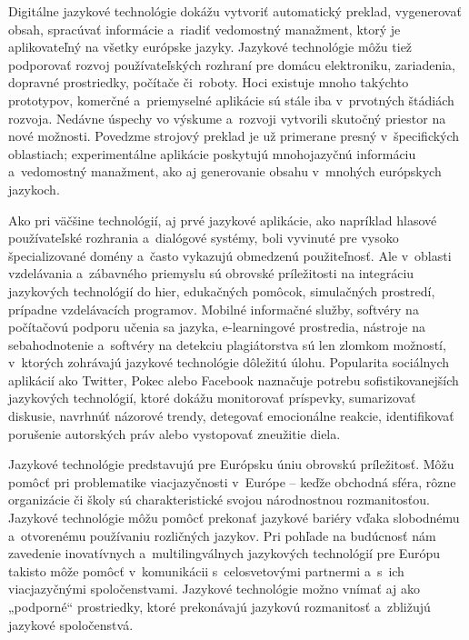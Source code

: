 \begin{multicols}{2}
Digitálne jazykové technológie dokážu vytvoriť automatický preklad, vygenerovať obsah, spracúvať informácie a~riadiť vedomostný manažment, ktorý je aplikovateľný na všetky európske jazyky. Jazykové technológie môžu tiež podporovať rozvoj používateľských rozhraní pre domácu elektroniku, zariadenia, dopravné prostriedky, počítače či~roboty. Hoci existuje mnoho takýchto prototypov, komerčné a~priemyselné aplikácie sú stále iba v~prvotných štádiách rozvoja. Nedávne úspechy vo výskume a~rozvoji vytvorili skutočný priestor na nové možnosti. Povedzme strojový preklad je už primerane presný v~špecifických oblastiach; experimentálne aplikácie poskytujú mnohojazyčnú informáciu a~vedomostný manažment, ako aj generovanie obsahu v~mnohých európskych jazykoch.

Ako pri väčšine technológií, aj prvé jazykové aplikácie, ako napríklad hlasové používateľské rozhrania a~dialógové systémy, boli vyvinuté pre vysoko špecializované domény a~často vykazujú obmedzenú použiteľnosť. Ale v~oblasti vzdelávania a~zábavného priemyslu sú obrovské príležitosti na integráciu jazykových technológií do hier, edukačných pomôcok, simulačných prostredí, prípadne vzdelávacích programov. Mobilné informačné služby, softvéry na počítačovú podporu učenia sa jazyka, e-learningové prostredia, nástroje na sebahodnotenie a~softvéry na detekciu plagiátorstva sú len zlomkom možností, v~ktorých zohrávajú jazykové technológie dôležitú úlohu. Popularita sociálnych aplikácií ako Twitter, Pokec alebo Facebook naznačuje potrebu sofistikovanejších jazykových technológií, ktoré dokážu monitorovať príspevky, sumarizovať diskusie, navrhnúť názorové trendy, detegovať emocionálne reakcie, identifikovať porušenie autorských práv alebo vystopovať zneužitie diela.


Jazykové technológie predstavujú pre Eu\-róp\-sku úniu obrovskú
príležitosť. Môžu pomôcť pri problematike viacjazyčnosti
v~Eu\-ró\-pe – keďže  obchodná sféra, rôzne organizácie či školy
sú charakteristické svojou národnostnou rozmanitosťou. Jazykové technológie môžu
pomôcť prekonať jazykové bariéry vďaka slobodnému a~otvorenému
používaniu rozličných jazykov. Pri pohľade na budúcnosť nám
zavedenie inovatívnych a~multilingválnych jazykových technológií
pre Európu takisto môže pomôcť v~komunikácii s~celosvetovými
partnermi a~s~ich   viacjazyčnými spoločenstvami. Jazykové
technológie možno vnímať aj ako „podporné“ prostriedky, ktoré
prekonávajú jazykovú rozmanitosť a~zbližujú jazykové
spoločenstvá.


\end{multicols}
